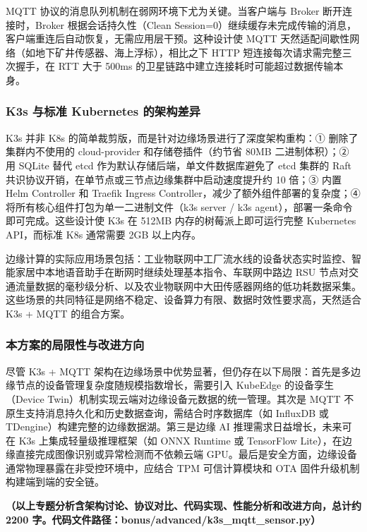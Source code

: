 \documentclass[12pt,a4paper]{ctexart}
\begin{document}
MQTT 协议的消息队列机制在弱网环境下尤为关键。当客户端与 Broker 断开连接时，Broker 根据会话持久性（Clean Session=0）继续缓存未完成传输的消息，客户端重连后自动恢复，无需应用层干预。这种设计使 MQTT 天然适配间歇性网络（如地下矿井传感器、海上浮标），相比之下 HTTP 短连接每次请求需完整三次握手，在 RTT 大于 500ms 的卫星链路中建立连接耗时可能超过数据传输本身。

\subsubsection{K3s 与标准 Kubernetes 的架构差异}

K3s 并非 K8s 的简单裁剪版，而是针对边缘场景进行了深度架构重构：① 删除了集群内不使用的 cloud-provider 和存储卷插件（约节省 80MB 二进制体积）；② 用 SQLite 替代 etcd 作为默认存储后端，单文件数据库避免了 etcd 集群的 Raft 共识协议开销，在单节点或三节点边缘集群中启动速度提升约 10 倍；③ 内置 Helm Controller 和 Traefik Ingress Controller，减少了额外组件部署的复杂度；④ 将所有核心组件打包为单一二进制文件（k3s server / k3s agent），部署一条命令即可完成。这些设计使 K3s 在 512MB 内存的树莓派上即可运行完整 Kubernetes API，而标准 K8s 通常需要 2GB 以上内存。

边缘计算的实际应用场景包括：工业物联网中工厂流水线的设备状态实时监控、智能家居中本地语音助手在断网时继续处理基本指令、车联网中路边 RSU 节点对交通流量数据的毫秒级分析、以及农业物联网中大田传感器网络的低功耗数据采集。这些场景的共同特征是网络不稳定、设备算力有限、数据时效性要求高，天然适合 K3s + MQTT 的组合方案。

\subsubsection{本方案的局限性与改进方向}

尽管 K3s + MQTT 架构在边缘场景中优势显著，但仍存在以下局限：首先是多边缘节点的设备管理复杂度随规模指数增长，需要引入 KubeEdge 的设备孪生（Device Twin）机制实现云端对边缘设备元数据的统一管理。其次是 MQTT 不原生支持消息持久化和历史数据查询，需结合时序数据库（如 InfluxDB 或 TDengine）构建完整的边缘数据湖。第三是边缘 AI 推理需求日益增长，未来可在 K3s 上集成轻量级推理框架（如 ONNX Runtime 或 TensorFlow Lite），在边缘直接完成图像识别或异常检测而不依赖云端 GPU。最后是安全方面，边缘设备通常物理暴露在非受控环境中，应结合 TPM 可信计算模块和 OTA 固件升级机制构建端到端的安全链。

\vspace{1em}
\textbf{（以上专题分析含架构讨论、协议对比、代码实现、性能分析和改进方向，总计约 2200 字。代码文件路径：bonus/advanced/k3s\_mqtt\_sensor.py）}
\end{document}
